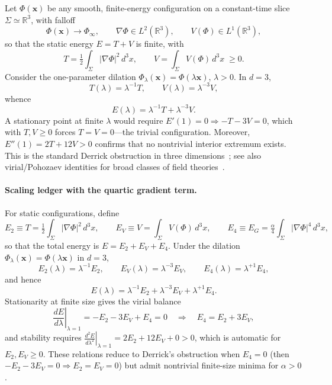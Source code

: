 \documentclass{article}
\begin{document}
Let $\Phi(\mathbf{x})$ be any smooth, finite-energy configuration on a constant-time slice $\Sigma\simeq\mathbb{R}^3$, with falloff
\begin{equation}
\Phi(\mathbf{x})\to\Phi_\infty, 
\qquad 
\nabla\Phi \in L^2(\mathbb{R}^3),
\qquad
V(\Phi)\in L^1(\mathbb{R}^3),
\end{equation}
so that the static energy $E = T+V$ is finite, with
\begin{equation}
T=\tfrac12\!\int_{\Sigma}|\nabla\Phi|^2\,d^3x,
\qquad
V=\!\int_{\Sigma}V(\Phi)\,d^3x \;\ge 0.
\end{equation}
Consider the one-parameter dilation $\Phi_\lambda(\mathbf{x})=\Phi(\lambda\mathbf{x})$, $\lambda>0$. In $d=3$,
\begin{equation}
T(\lambda)=\lambda^{-1}T,
\qquad
V(\lambda)=\lambda^{-3}V,
\label{eq:DerrickScalingTV}
\end{equation}
whence
\begin{equation}
E(\lambda)=\lambda^{-1}T+\lambda^{-3}V.
\end{equation}
A stationary point at finite $\lambda$ would require $E'(1)=0\Rightarrow -T-3V=0$, which with $T,V\ge0$ forces $T=V=0$—the trivial configuration. Moreover, $E''(1)=2T+12V>0$ confirms that no nontrivial interior extremum exists. This is the standard Derrick obstruction in three dimensions~\cite{Derrick1964}; see also virial/Pohozaev identities for broad classes of field theories~\cite{Pombo2024_Virial}.
\paragraph{Scaling ledger with the quartic gradient term.}
For static configurations, define
\[
E_2 \equiv T=\tfrac12\!\int_{\Sigma} |\nabla\Phi|^2\,d^3x,\qquad
E_V \equiv V=\!\int_{\Sigma} V(\Phi)\,d^3x,\qquad
E_4 \equiv E_G=\tfrac{\alpha}{4}\!\int_{\Sigma} |\nabla\Phi|^4\,d^3x,
\]
so that the total energy is \(E=E_2+E_V+E_4\).
Under the dilation \(\Phi_\lambda(\mathbf{x})=\Phi(\lambda\mathbf{x})\) in \(d=3\),
\begin{equation}
E_2(\lambda)=\lambda^{-1}E_2,\qquad
E_V(\lambda)=\lambda^{-3}E_V,\qquad
E_4(\lambda)=\lambda^{+1}E_4,
\label{eq:ledger_scalings}
\end{equation}
and hence
\begin{equation}
E(\lambda)=\lambda^{-1}E_2+\lambda^{-3}E_V+\lambda^{+1}E_4.
\label{eq:E_lambda_ledger}
\end{equation}
Stationarity at finite size gives the virial balance
\begin{equation}
\left.\frac{dE}{d\lambda}\right|_{\lambda=1}= -E_2 - 3E_V + E_4 = 0
\quad\Longrightarrow\quad
E_4 = E_2 + 3E_V,
\label{eq:virial_balance_quartic}
\end{equation}
and stability requires \(\left.\tfrac{d^2E}{d\lambda^2}\right|_{\lambda=1}=2E_2+12E_V+0>0\), which is automatic for \(E_2,E_V\ge0\).
These relations reduce to Derrick’s obstruction when \(E_4=0\) (then \(-E_2-3E_V=0\Rightarrow E_2=E_V=0\)) but admit nontrivial finite-size minima for \(\alpha>0\).
\end{document}
